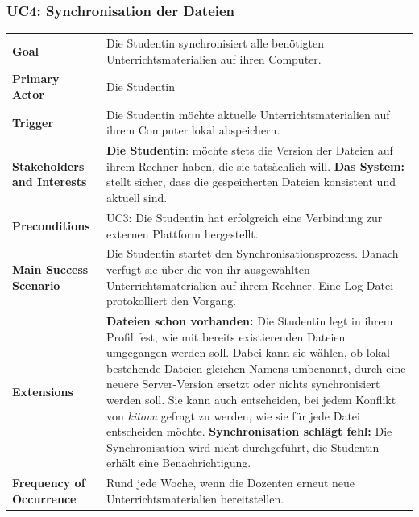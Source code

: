 \documentclass[a4paper]{article}
\begin{document}
\subsubsection{UC4: Synchronisation der Dateien}

\begin{tabulary}{\linewidth}{lp{30em}}
	\textbf{Goal} & Die Studentin synchronisiert alle benötigten Unterrichtsmaterialien auf ihren Computer. \\
	\textbf{Primary Actor} & Die Studentin \\
	\textbf{Trigger} & Die Studentin möchte aktuelle Unterrichtsmaterialien auf ihrem Computer lokal abspeichern. \\
	\textbf{Stakeholders and Interests} & \textbf{Die Studentin}: möchte stets die Version der Dateien auf ihrem Rechner haben, die sie tatsächlich will. \textbf{Das System:}  stellt sicher, dass die gespeicherten Dateien konsistent und aktuell sind.\\
	\textbf{Preconditions} & UC3: Die Studentin hat erfolgreich eine Verbindung zur externen Plattform hergestellt. \\
	\textbf{Main Success Scenario} & Die Studentin startet den Synchronisationsprozess. Danach verfügt sie über die von ihr ausgewählten Unterrichtsmaterialien auf ihrem Rechner. Eine Log-Datei protokolliert den Vorgang. \\
	\textbf{Extensions} & \textbf{Dateien schon vorhanden:} Die Studentin legt in ihrem Profil fest, wie mit bereits existierenden Dateien umgegangen werden soll. Dabei kann sie wählen, ob lokal bestehende Dateien gleichen Namens umbenannt, durch eine neuere Server-Version ersetzt oder nichts synchronisiert werden soll. Sie kann auch entscheiden, bei jedem Konflikt von \emph{kitovu} gefragt zu werden, wie sie für jede Datei entscheiden möchte. \textbf{Synchronisation schlägt fehl:} Die Synchronisation wird nicht durchgeführt, die Studentin erhält eine Benachrichtigung.\\
	\textbf{Frequency of Occurrence} & Rund jede Woche, wenn die Dozenten erneut neue Unterrichtsmaterialien bereitstellen.  \\
\end{tabulary}
\end{document}
